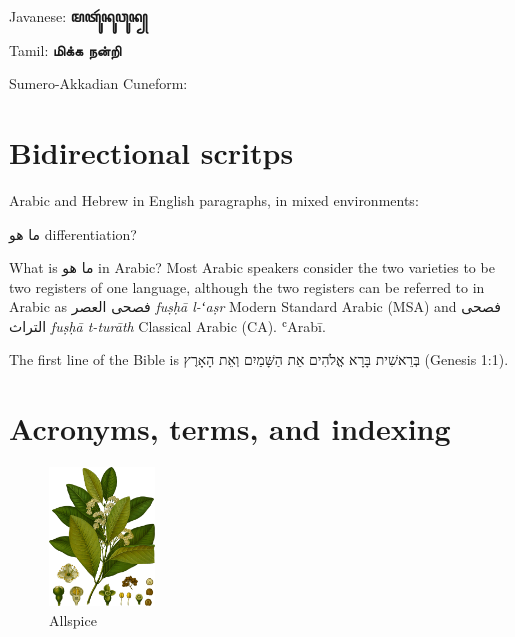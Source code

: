 Javanese: { \textbf{ꦩꦠꦸꦂꦤꦸꦮꦸꦤ꧀}}

Tamil: { \textbf{மிக்க நன்றி}}

Sumero-Akkadian Cuneform: {\cuneifont{\GA \NU \UU \UM \Leftarrow \GI}}



\section{Bidirectional scritps}

Arabic and Hebrew in English paragraphs, in mixed environments:

ما هو \foreignlanguage{english}{differentiation}? 

What is ما هو in Arabic?
\medskip
\textnormal
\noindent Most Arabic speakers consider the two varieties to be two registers
of one language, although the two registers can be referred to in
Arabic as فصحى العصر \textit{fuṣḥā l-ʻaṣr} Modern Standard Arabic (MSA) and
فصحى التراث \textit{fuṣḥā t-turāth} Classical Arabic (CA). ʿArab\={i}.

\medskip

The first line of the Bible is בְּרֵאשִׁית בָּרָא אֱלֹהִים אֵת הַשָּׁמַיִם וְאֵת הָאָרֶץ (Genesis 1:1).






\section{Acronyms, terms, and indexing}

\begin{figure}
  \includegraphics[width=0.25\textwidth]{imgs/kohler/allspice_kohler_min.png}
  \caption{Allspice}
\end{figure}

